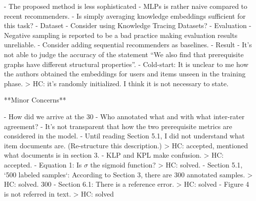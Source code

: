     - The proposed method is less sophisticated
        - MLPs is rather naive compared to recent recommenders.
        - Is simply averaging knowledge embeddings sufficient for this task?
- Dataset
    - Consider using Knowledge Tracing Datasets?
- Evaluation
    - Negative sampling is reported to be a bad practice making evaluation results unreliable.
    - Consider adding sequential recommenders as baselines.
- Result
    - It’s not able to judge the accuracy of the statement “We also find that prerequisite graphs have different structural properties”.
    - Cold-start: It is unclear to me how the authors obtained the embeddings for users and items unseen in the training phase.
    > HC: it's randomly initialized. I think it is not necessary to state.

**Minor Concerns**

- How did we arrive at the 30%
- Who annotated what and with what inter-rater agreement?
- It’s not transparent that how the two prerequisite metrics are considered in the model.
- Until reading Section 5.1, I did not understand what item documents are. (Re-structure this description.)
> HC: accepted, mentioned what documents is in section 3.
- KLP and KPL make confusion.
> HC: accepted.
- Equation 1: Is $\sigma$ the sigmoid function?
> HC: solved.
- Section 5.1, `500 labeled samples`: According to Section 3, there are 300 annotated samples.
> HC: solved. 300
- Section 6.1: There is a reference error.
> HC: solved
- Figure 4 is not referred in text.
> HC: solved
